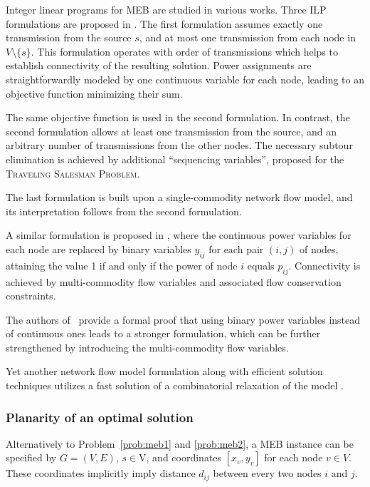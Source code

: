 Integer linear programs for MEB are studied in various works.
Three ILP formulations are proposed in \cite{das03}.
The first formulation assumes exactly one transmission from the source $s$, and at most one transmission from each node in $V\setminus\{s\}$.
This formulation operates with order of transmissions which helps to establish connectivity of the resulting solution.
Power assignments are straightforwardly modeled by one continuous variable for each node, leading to an objective function minimizing their sum.

The same objective function is used in the second formulation.
In contrast, the second formulation allows at least one transmission from the source, and an arbitrary number of transmissions from the other nodes.
The necessary subtour elimination is achieved by additional ``sequencing variables'', proposed for the \textsc{Traveling Salesman Problem}.

The last formulation is built upon a single-commodity network flow model, and its interpretation follows from the second formulation.

A similar formulation is proposed in \cite{yuan05}, where the continuous power variables for each node are replaced by binary variables $y_{ij}$ for each pair $(i,j)$ of nodes,
attaining the value 1 if and only if the power of node $i$ equals $p_{ij}$.
Connectivity is achieved by multi-commodity flow variables and associated flow conservation constraints.

The authors of~\cite{haugland11} provide a formal proof that using binary power variables instead of continuous ones leads to a stronger formulation,
which can be further strengthened by introducing the multi-commodity flow variables.

Yet another network flow model formulation along with efficient solution techniques utilizes a fast solution of a combinatorial relaxation of the model \cite{min06}.

\subsubsection{Planarity of an optimal solution}

Alternatively to Problem~\ref{prob:meb1} and \ref{prob:meb2}, a MEB instance can be specified by $G=(V,E)$, $s\in $V, and coordinates $\left[x_v,y_v\right]$ for each node $v\in V$.
These coordinates implicitly imply distance $d_{ij}$ between every two nodes $i$ and $j$.

